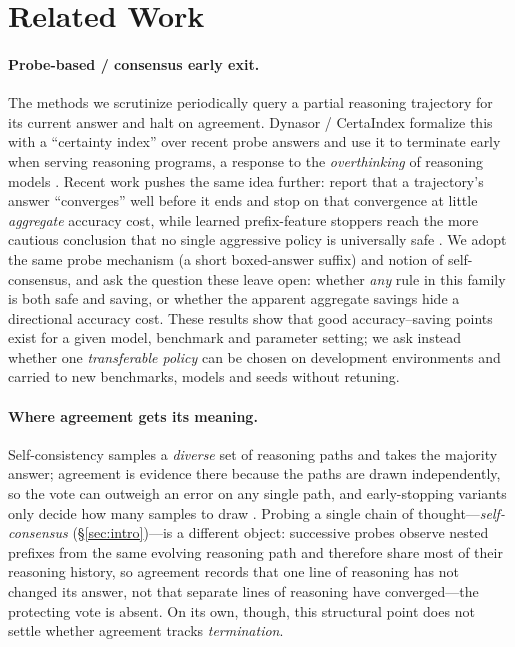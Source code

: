 \section{Related Work}
\label{sec:related}

\paragraph{Probe-based / consensus early exit.}
The methods we scrutinize periodically query a partial reasoning trajectory for
its current answer and halt on agreement. Dynasor / CertaIndex
\citep{dynasor_certaindex} formalize this with a ``certainty index'' over recent
probe answers and use it to terminate early when serving reasoning programs, a
response to the \emph{overthinking} of reasoning models
\citep{overthinking,deer}. Recent work pushes the same idea further:
\citet{liu2025answerconvergence} report that a trajectory's answer ``converges''
well before it ends and stop on that convergence at little \emph{aggregate}
accuracy cost, while learned prefix-feature stoppers reach the more cautious
conclusion that no single aggressive policy is universally safe
\citep{dong2026learnstop}. We adopt the same probe mechanism (a short
boxed-answer suffix) and notion of self-consensus, and ask the question these
leave open: whether \emph{any} rule in this family is both safe and saving, or
whether the apparent aggregate savings hide a directional accuracy cost. These
results show that good accuracy--saving points exist for a given model,
benchmark and parameter setting; we ask instead whether one \emph{transferable
policy} can be chosen on development environments and carried to new
benchmarks, models and seeds without retuning.

\paragraph{Where agreement gets its meaning.}
Self-consistency \citep{wang2023selfconsistency} samples a \emph{diverse} set of
reasoning paths and takes the majority answer; agreement is evidence there
because the paths are drawn independently, so the vote can outweigh an error on
any single path, and early-stopping variants only decide how many samples to
draw \citep{aggarwal2023adaptive,li2024esc}. Probing a single chain of
thought---\emph{self-consensus} (\S\ref{sec:intro})---is a different object:
successive probes observe nested prefixes from the same evolving reasoning path
and therefore share most of their reasoning history, so agreement records that
one line of reasoning has not changed its answer, not that separate lines of
reasoning have converged---the protecting vote is absent. On its own, though, this
structural point does not settle whether agreement tracks \emph{termination}.


